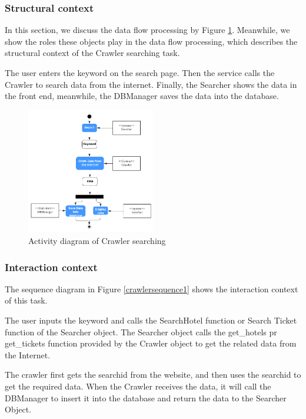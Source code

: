 \documentclass[conference]{IEEEtran}
\begin{document}
\subsubsection{\textbf{Structural context }}
\textbf{}

In this section, we discuss the data flow processing by Figure \ref{crawleractivity1}. Meanwhile, we show the roles these objects play in the data flow processing, which describes the structural context of the Crawler searching task.

The user enters the keyword on the search page. Then the service calls the Crawler to search data from the internet. Finally, the Searcher shows the data in the front end, meanwhile, the DBManager saves the data into the database.
\begin{figure}[htbp]
	\centerline{\includegraphics[width=0.5\textwidth]{image/crawler activity1.pdf}}
	\caption{Activity diagram of Crawler searching }
	\label{crawleractivity1}
\end{figure}


\subsubsection{\textbf{Interaction context }}
\textbf{}

The sequence diagram in Figure \ref{crawlersequence1} shows the interaction context of this task. 

The user inputs the keyword and calls the SearchHotel function or Search Ticket function of the Searcher object. The Searcher object calls the get\_hotels pr get\_tickets function provided by the Crawler object to get the related data from the Internet.

The crawler first gets the searchid from the website, and then uses the searchid to get the required data. When the Crawler receives the data, it will call the DBManager to insert it into the database and return the data to the Searcher Object.
\end{document}
